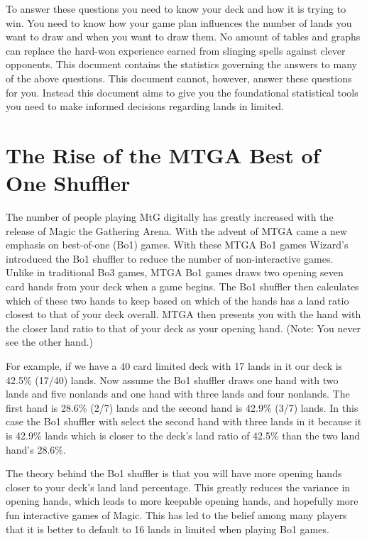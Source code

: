 \documentclass[oneside]{book}   %
\begin{document}
To answer these questions you need to know your deck and how it is trying to win. You need to know how your game plan influences the number of lands you want to draw and when you want to draw them. No amount of tables and graphs can replace the hard-won experience earned from slinging spells against clever opponents. This document contains the statistics governing the answers to many of the above questions. This document cannot, however, answer these questions for you. Instead this document aims to give you the foundational statistical tools you need to make informed decisions regarding lands in limited.

\section{The Rise of the MTGA Best of One Shuffler}
\label{sec:computers_overview}

The number of people playing MtG digitally has greatly increased with the release of Magic the Gathering Arena. With the advent of MTGA came a new emphasis on best-of-one (Bo1) games. With these MTGA Bo1 games Wizard's introduced the Bo1 shuffler to reduce the number of non-interactive games. Unlike in traditional Bo3 games, MTGA Bo1 games draws two opening seven card hands from your deck when a game begins. The Bo1 shuffler then calculates which of these two hands to keep based on which of the hands has a land ratio closest to that of your deck overall. MTGA then presents you with the hand with the closer land ratio to that of your deck as your opening hand. (Note: You never see the other hand.)

For example, if we have a 40 card limited deck with 17 lands in it our deck is 42.5\% (17/40) lands. Now assume the Bo1 shuffler draws one hand with two lands and five nonlands and one hand with three lands and four nonlands. The first hand is 28.6\% (2/7) lands and the second hand is 42.9\% (3/7) lands. In this case the Bo1 shuffler with select the second hand with three lands in it because it is 42.9\% lands which is closer to the deck's land ratio of 42.5\% than the two land hand's 28.6\%. 

The theory behind the Bo1 shuffler is that you will have more opening hands closer to your deck's land land percentage. This greatly reduces the variance in opening hands, which leads to more keepable opening hands, and hopefully more fun interactive games of Magic. This has led to the belief among many players that it is better to default to 16 lands in limited when playing Bo1 games.
\end{document}
